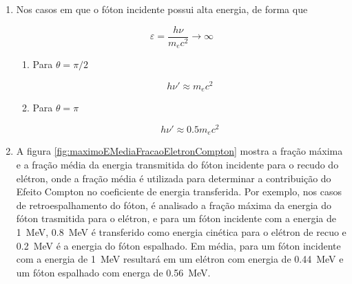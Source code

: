 \documentclass[11pt,a4paper]{article}
\newcounter{exemplo}
\begin{document}
\begin{enumerate}
                    \item Nos casos em que o fóton incidente possui alta energia, de forma que
                    
                        $$\varepsilon = \frac{h\nu}{m_ec^2} \rightarrow \infty$$

                    \noindent

                        \begin{enumerate}
                            \item Para $\theta = \pi/2$
                            
                                \begin{equation}
                                    h\nu' \approx m_ec^2
                                \end{equation}

                            \item Para $\theta = \pi$
                            
                                \begin{equation}
                                    h\nu' \approx 0.5 m_ec^2
                                \end{equation}
                        \end{enumerate}

                    \item A figura \ref{fig:maximoEMediaFracaoEletronCompton} mostra a fração máxima e a fração média da energia transmitida do fóton incidente para o recudo do elétron, onde a fração média é utilizada para determinar a contribuição do Efeito Compton no coeficiente de energia transferida. Por exemplo, nos casos de retroespalhamento do fóton, é analisado a fração máxima da energia do fóton trasmitida para o elétron, e para um fóton incidente com a energia de \qty{1}{MeV}, \qty{0.8}{MeV} é transferido como energia cinética para o elétron de recuo e \qty{0.2}{MeV} é a energia do fóton espalhado. Em média, para um fóton incidente com a energia de \qty{1}{MeV} resultará em um elétron com energia de \qty{0.44}{MeV} e um fóton espalhado com energa de \qty{0.56}{MeV}.
                    

\end{enumerate}
\end{document}
